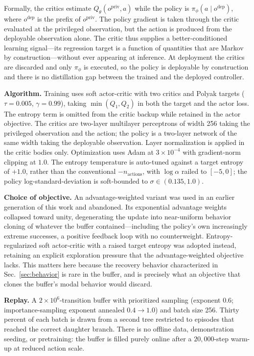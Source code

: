 Formally, the critics estimate $Q_{\theta}(o^{\mathrm{priv}}, a)$ while the policy is
$\pi_{\phi}(a \mid o^{\mathrm{dep}})$, where $o^{\mathrm{dep}}$ is the prefix of
$o^{\mathrm{priv}}$. The policy gradient is taken through the critic evaluated at the privileged
observation, but the action is produced from the deployable observation alone. The critic thus
supplies a better-conditioned learning signal---its regression target is a function of quantities
that are Markov by construction---without ever appearing at inference. At deployment the critics
are discarded and only $\pi_{\phi}$ is executed, so the policy is deployable by construction and
there is no distillation gap between the trained and the deployed controller.

\textbf{Algorithm.} Training uses soft actor-critic with two critics and Polyak targets
($\tau = 0.005$, $\gamma = 0.99$), taking $\min(Q_1, Q_2)$ in both the target and the actor
loss. The entropy term is omitted from the critic backup while retained in the actor objective.
The critics are two-layer multilayer perceptrons of width 256 taking the privileged observation
and the action; the policy is a two-layer network of the same width taking the deployable
observation. Layer normalization is applied in the critic bodies only. Optimization uses Adam at
$3 \times 10^{-4}$ with gradient-norm clipping at $1.0$. The entropy temperature is auto-tuned
against a target entropy of $+1.0$, rather than the conventional $-n_{\mathrm{actions}}$, with
$\log \alpha$ railed to $[-5, 0]$; the policy log-standard-deviation is soft-bounded to
$\sigma \in (0.135, 1.0)$.

\textbf{Choice of objective.} An advantage-weighted variant was used in an earlier generation of
this work and abandoned. Its exponential advantage weights collapsed toward unity, degenerating
the update into near-uniform behavior cloning of whatever the buffer contained---including the
policy's own increasingly extreme successes, a positive feedback loop with no counterweight.
Entropy-regularized soft actor-critic with a raised target entropy was adopted instead,
retaining an explicit exploration pressure that the advantage-weighted objective lacks. This
matters here because the recovery behavior characterized in Sec.~\ref{sec:behavior} is rare in
the buffer, and is precisely what an objective that clones the buffer's modal behavior would
discard.

\textbf{Replay.} A $2 \times 10^{6}$-transition buffer with prioritized sampling (exponent
$0.6$; importance-sampling exponent annealed $0.4 \rightarrow 1.0$) and batch size 256. Thirty
percent of each batch is drawn from a second tree restricted to episodes that reached the
correct daughter branch. There is no offline data, demonstration seeding, or pretraining: the
buffer is filled purely online after a $20{,}000$-step warm-up at reduced action scale.

